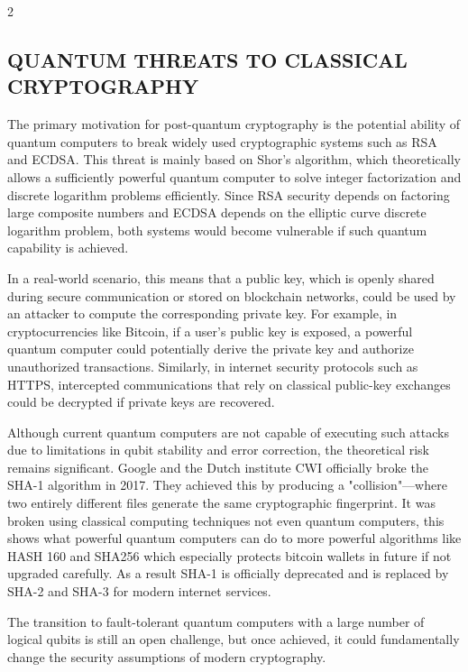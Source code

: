 \begin{multicols}{2}
  \subsection*{\centering\uppercase{Quantum Threats to Classical Cryptography}}
  The primary motivation for post-quantum cryptography is the potential ability of quantum computers
  to break widely used cryptographic systems such as RSA and ECDSA. This threat is mainly based on
  Shor’s algorithm, which theoretically allows a sufficiently powerful quantum computer to solve
  integer factorization and discrete logarithm problems efficiently. Since RSA security depends on
  factoring large composite numbers and ECDSA depends on the elliptic curve discrete logarithm
  problem, both systems would become vulnerable if such quantum capability is achieved.

  \noindent
  In a real-world scenario, this means that a public key, which is openly shared during secure
  communication or stored on blockchain networks, could be used by an attacker to compute the
  corresponding private key. For example, in cryptocurrencies like Bitcoin, if a user’s public key is
  exposed, a powerful quantum computer could potentially derive the private key and authorize
  unauthorized transactions. Similarly, in internet security protocols such as HTTPS, intercepted
  communications that rely on classical public-key exchanges could be decrypted if private keys are
  recovered.

  \noindent
  Although current quantum computers are not capable of executing such attacks due to limitations in
  qubit stability and error correction, the theoretical risk remains significant. Google and the Dutch
  institute CWI officially broke the SHA-1 algorithm in 2017. They achieved this by producing a
  "collision"—where two entirely different files generate the same cryptographic fingerprint. It was
  broken using classical computing techniques not even quantum computers, this shows what powerful
  quantum computers can do to more powerful algorithms like HASH 160 and SHA256 which
  especially protects bitcoin wallets in future if not upgraded carefully. As a result SHA-1 is officially
  deprecated and is replaced by SHA-2 and SHA-3 for modern internet services.

  \noindent
  The transition to fault-tolerant quantum computers with a large number of logical qubits is still an
  open challenge, but once achieved, it could fundamentally change the security assumptions of modern
  cryptography.


\end{multicols}
